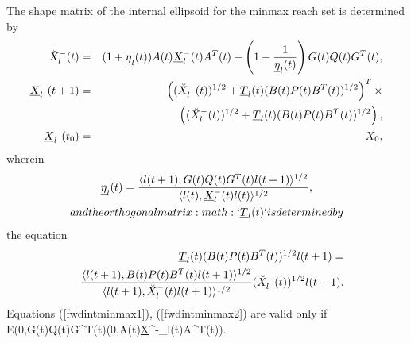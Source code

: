 \documentclass[letterpaper,10pt,english]{sphinxmanual}
\begin{document}
The shape matrix of the internal ellipsoid for the minmax reach set is
determined by
\begin{gather}
\begin{split}\begin{aligned}
\breve{X}^-_l(t) & = & (1+\underline{\eta}_l(t))A(t)\underline{X}^-_l(t)A^T(t) +
\left(1+\frac{1}{\underline{\eta}_l(t)}\right)
G(t)Q(t)G^T(t), \label{fwdintminmax1} \\
\underline{X}^-_l(t+1) & = & \left((\breve{X}^-_l(t))^{1/2} +
\underline{T}_l(t)(B(t)P(t)B^T(t))^{1/2}\right)^T
\times \nonumber \\
& &\left((\breve{X}^-_l(t))^{1/2} + \underline{T}_l(t)(B(t)P(t)B^T(t))^{1/2}\right),
\label{fwdintminmax2}\\
\underline{X}^-_l(t_0) & = & X_0, \label{fwdintminmax3}\end{aligned}\end{split}\notag
\end{gather}
wherein
\begin{gather}
\begin{split}  \underline{\eta}_l(t) = \frac{\langle l(t+1),
  G(t)Q(t)G^T(t)l(t+1)\rangle^{1/2}}{\langle l(t),
  \underline{X}^-_l(t)l(t)\rangle^{1/2}},\end{split}\notag\\\begin{split}and the orthogonal matrix :math:`\underline{T}_l(t)` is determined by\end{split}\notag
\end{gather}
the equation
\begin{gather}
\begin{split}\begin{aligned}
& & \underline{T}_l(t)(B(t)P(t)B^T(t))^{1/2}l(t+1) = \\
& & \frac{\langle l(t+1),
B(t)P(t)B^T(t)l(t+1)\rangle^{1/2}}{\langle l(t+1),
\breve{X}^-_l(t)l(t+1)\rangle^{1/2}}(\breve{X}^-_l(t))^{1/2}l(t+1).\end{aligned}\end{split}\notag
\end{gather}
Equations ({[}fwdintminmax1{]}), ({[}fwdintminmax2{]}) are valid only if
{\mathcal E}(0,G(t)Q(t)G^T(t)(0,A(t)\underline{X}^-_l(t)A^T(t)).
\end{document}
